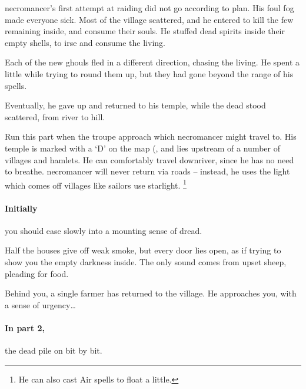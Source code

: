 \begin{exampletext}
  \Gls{necromancer}'s first attempt at raiding  did not go according to plan.
  His foul fog made everyone sick.
  Most of the \gls{village} scattered, and he entered to kill the few remaining inside, and consume their souls.
  He stuffed dead spirits inside their empty shells, to irse and consume the living.

  Each of the new ghouls fled in a different direction, chasing the living.
  He spent a little while trying to round them up, but they had gone beyond the range of his spells.

  Eventually, he gave up and returned to his temple, while the dead stood scattered, from river to hill.
\end{exampletext}

Run this part when the troupe approach  which \gls{necromancer} might travel to.
His temple is marked with a `\gls{D}' on the map (, and lies upstream of a number of \glspl{village} and hamlets.
He can comfortably travel downriver, since he has no need to breathe.%
\Gls{necromancer} will never return via roads -- instead, he uses the light which comes off \glspl{village} like sailors use starlight.
\footnote{He can also cast Air spells to float a little.}

\paragraph{Initially}
you should ease slowly into a mounting sense of dread.

\begin{boxtext}
  Half the houses give off weak smoke, but every door lies open, as if trying to show you the empty darkness inside.
  The only sound comes from upset sheep, pleading for food.

  Behind you, a single farmer has returned to the \gls{village}.
  He approaches you, with a sense of urgency\ldots
\end{boxtext}


\paragraph{In part 2,}
the dead pile on bit by bit.



